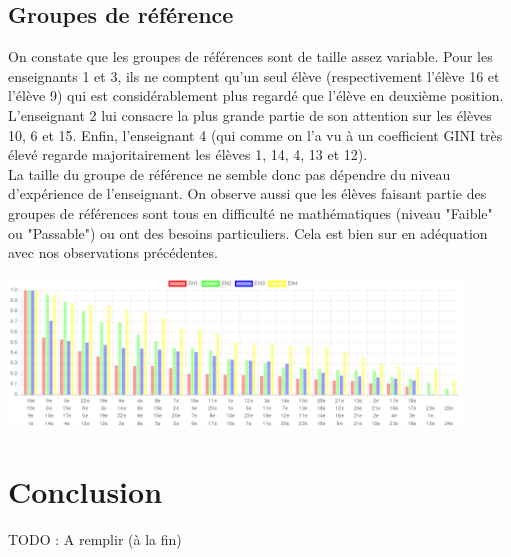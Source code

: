 \documentclass{article}
\begin{document}
\subsection{Groupes de référence}
On constate que les groupes de références sont de taille assez variable. Pour les enseignants 1 et 3, ils ne comptent qu'un seul élève (respectivement l'élève 16 et l'élève 9) qui est considérablement plus regardé que l'élève en deuxième position. L'enseignant 2 lui consacre la plus grande partie de son attention sur les élèves 10, 6 et 15. Enfin, l'enseignant 4 (qui comme on l'a vu à un coefficient GINI très élevé regarde majoritairement les élèves 1, 14, 4, 13 et 12).\\
La taille du groupe de référence ne semble donc pas dépendre du niveau d'expérience de l'enseignant. On observe aussi que les élèves faisant partie des groupes de références sont tous en difficulté ne mathématiques (niveau "Faible" ou "Passable") ou ont des besoins particuliers. Cela est bien sur en adéquation avec nos observations précédentes.
\begin{center}
    \includegraphics[height=4cm]{ordre_decroissant.png}
\end{center}

\section{Conclusion}
TODO : A remplir (à la fin)

{}

\end{document}
